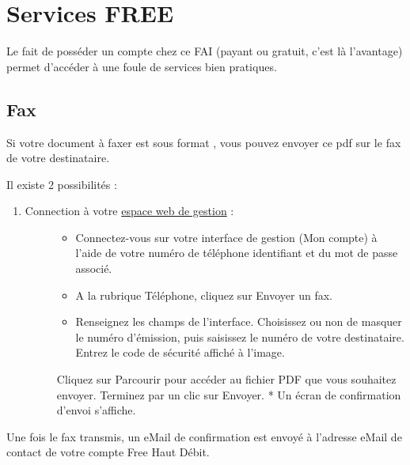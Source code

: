 \documentclass[a4paper,12pt,french]{sphinxmanual}
\begin{document}
\section{Services FREE}
\label{ftpwebmail/services-free:services-free}\label{ftpwebmail/services-free::doc}
Le fait de posséder un compte chez ce FAI (payant ou gratuit, c'est là l'avantage) permet d'accéder à une foule de services bien pratiques.


\subsection{Fax}
\label{ftpwebmail/services-free:fax}
Si votre document à faxer est sous format , vous pouvez envoyer ce pdf sur le fax de votre destinataire.

Il existe 2 possibilités :
\begin{enumerate}
\item {} \begin{description}
\item[{Connection à votre \href{http://www.free.fr/adsl/pages/accueil/plus-de-20-exclusivites/service-de-fax.html}{espace web de gestion} :}] \leavevmode\begin{itemize}
\item {} 
Connectez-vous sur votre interface de gestion (Mon compte) à l'aide de votre numéro de téléphone identifiant et du mot de passe associé.

\item {} 
A la rubrique Téléphone, cliquez sur Envoyer un fax.

\item {} 
Renseignez les champs de l'interface. Choisissez ou non de masquer le numéro d'émission, puis saisissez le numéro de votre destinataire. Entrez le code de sécurité affiché à l'image.

\end{itemize}

Cliquez sur Parcourir pour accéder au fichier PDF que vous souhaitez envoyer. Terminez par un clic sur Envoyer.
* Un écran de confirmation d'envoi s'affiche.

\end{description}

\end{enumerate}

Une fois le fax transmis, un eMail de confirmation est envoyé à l'adresse eMail de contact de votre compte Free Haut Débit.
\end{document}
